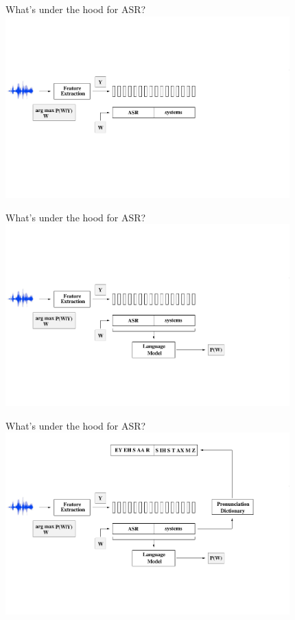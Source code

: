 \begin{frame}{What's under the hood for ASR?}
\includegraphics[height=70mm]{figures/ASR4}
\end{frame}

\begin{frame}{What's under the hood for ASR?}
\includegraphics[height=70mm]{figures/ASR5}
\end{frame}

\begin{frame}{What's under the hood for ASR?}
\includegraphics[height=70mm]{figures/ASR6}
\end{frame}

